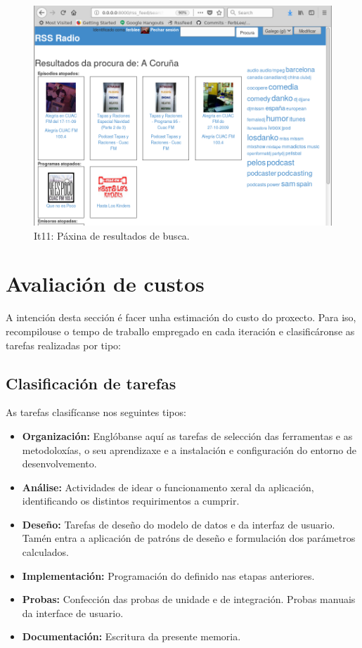 \begin{figure}[H]
	\centering
	\includegraphics[scale=0.45,keepaspectratio=true]{./images/procura_final.png}
	\caption{It11: Páxina de resultados de busca.}
	\label{fig:procura_final}
\end{figure}


\section{Avaliación de custos}

A intención desta sección é facer unha estimación do custo do proxecto. Para iso, recompilouse o tempo de traballo empregado en cada iteración e clasificáronse as tarefas realizadas por tipo:

\subsection{Clasificación de tarefas}

As tarefas clasifícanse nos seguintes tipos:

\begin{itemize}
	\item \textbf{Organización:} Englóbanse aquí as tarefas de selección das ferramentas e as metodoloxías, o seu aprendizaxe e a instalación e configuración do entorno de desenvolvemento. 
	\item \textbf{Análise:} Actividades de idear o funcionamento xeral da aplicación, identificando os distintos requirimentos a cumprir.
	\item \textbf{Deseño:} Tarefas de deseño do modelo de datos e da interfaz de usuario. Tamén entra a aplicación de patróns de deseño e formulación dos parámetros calculados. 
	\item \textbf{Implementación:} Programación do definido nas etapas anteriores. 
	\item \textbf{Probas:} Confección das probas de unidade e de integración. Probas manuais da interface de usuario.
	\item \textbf{Documentación:} Escritura da presente memoria.
\end{itemize} 



